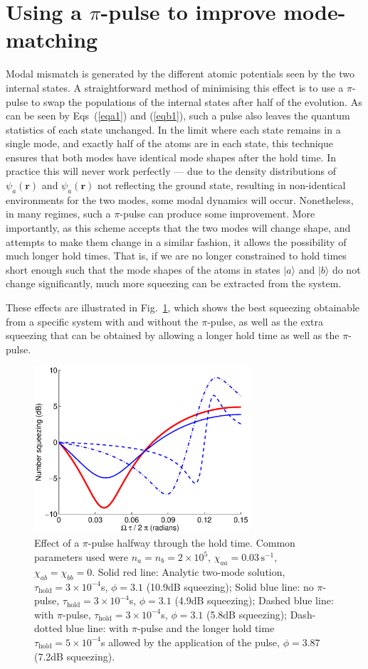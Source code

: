 \documentclass{iopart}
\begin{document}
\section{Using a $\pi$-pulse to improve mode-matching} \label{sec:pipulse}
Modal mismatch is generated by the different atomic potentials seen by the two internal states.  A straightforward method of minimising this effect is to use a $\pi$-pulse to swap the populations of the internal states after half of the evolution. As can be seen by Eqs~(\ref{eqa1}) and (\ref{eqb1}), such a pulse also leaves the quantum statistics of each state unchanged. In the limit where each state remains in a single mode, and exactly half of the atoms are in each state, this technique ensures that both modes have identical mode shapes after the hold time. In practice this will never work perfectly --- due to the density distributions of $\psi_a(\mathbf{r})$ and $\psi_a(\mathbf{r})$ not reflecting the ground state, resulting in non-identical environments for the two modes, some modal dynamics will occur. Nonetheless, in many regimes, such a $\pi$-pulse can produce some improvement. More importantly, as this scheme accepts that the two modes will change shape, and attempts to make them change in a similar fashion, it allows the possibility of much longer hold times. That is, if we are no longer constrained to hold times short enough such that the mode shapes of the atoms in states $|a \rangle$ and $|b \rangle$ do not change significantly, much more squeezing can be extracted from the system.

These effects are illustrated in Fig.~\ref{piPulseFig}, which shows the best squeezing obtainable from a specific system with and without the $\pi$-pulse, as well as the extra squeezing that can be obtained by allowing a longer hold time as well as the $\pi$-pulse.
\begin{figure}
    \centering
    \includegraphics[width=8cm]{figures/pi_pulse.eps}
    \caption{Effect of a $\pi$-pulse halfway through the hold time. Common parameters used were $n_a = n_b =2 \times 10^5$, $\chi_{aa}=0.03\,\text{s}^{-1}$, $\chi_{ab}=\chi_{bb}=0$. Solid red line: Analytic two-mode solution, $\tau_{\mathrm{hold}}=3\times 10^{-4}$s, $\phi=3.1$ (10.9dB squeezing); Solid blue line: no $\pi$-pulse, $\tau_{\mathrm{hold}}=3\times 10^{-4}$s, $\phi=3.1$ (4.9dB squeezing);  Dashed blue line: with $\pi$-pulse, $\tau_{\mathrm{hold}}=3\times 10^{-4}$s, $\phi=3.1$ (5.8dB squeezing); Dash-dotted blue line: with $\pi$-pulse and the longer hold time $\tau_{\mathrm{hold}}=5\times 10^{-4}$s allowed by the application of the pulse, $\phi=3.87$ (7.2dB squeezing).}
    \label{piPulseFig}
\end{figure}
\end{document}
